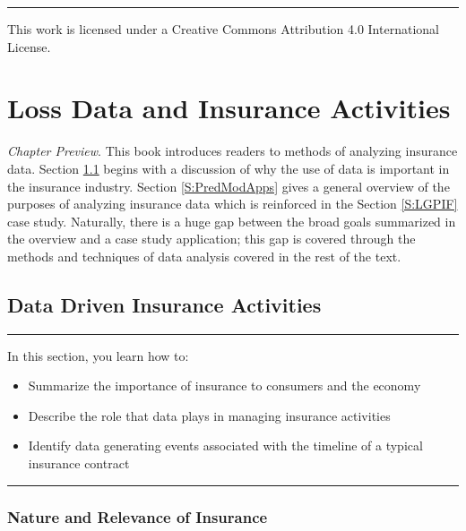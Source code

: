 \documentclass[
]{book}
\providecommand{\tightlist}{%
  \setlength{\itemsep}{0pt}\setlength{\parskip}{0pt}}
\begin{document}
\begin{center}\rule{0.5\linewidth}{0.5pt}\end{center}

This work is licensed under a Creative Commons Attribution 4.0 International License.

\hypertarget{ChapIntro}{%
\chapter{Loss Data and Insurance Activities}\label{ChapIntro}}

\emph{Chapter Preview}. This book introduces readers to methods of analyzing insurance data. Section \ref{S:Intro} begins with a discussion of why the use of data is important in the insurance industry. Section \ref{S:PredModApps} gives a general overview of the purposes of analyzing insurance data which is reinforced in the Section \ref{S:LGPIF} case study. Naturally, there is a huge gap between the broad goals summarized in the overview and a case study application; this gap is covered through the methods and techniques of data analysis covered in the rest of the text.

\hypertarget{S:Intro}{%
\section{Data Driven Insurance Activities}\label{S:Intro}}

\begin{center}\rule{0.5\linewidth}{0.5pt}\end{center}

In this section, you learn how to:

\begin{itemize}
\tightlist
\item
  Summarize the importance of insurance to consumers and the economy
\item
  Describe the role that data plays in managing insurance activities
\item
  Identify data generating events associated with the timeline of a typical insurance contract
\end{itemize}

\begin{center}\rule{0.5\linewidth}{0.5pt}\end{center}

\hypertarget{nature-and-relevance-of-insurance}{%
\subsection{Nature and Relevance of Insurance}\label{nature-and-relevance-of-insurance}}
\end{document}
